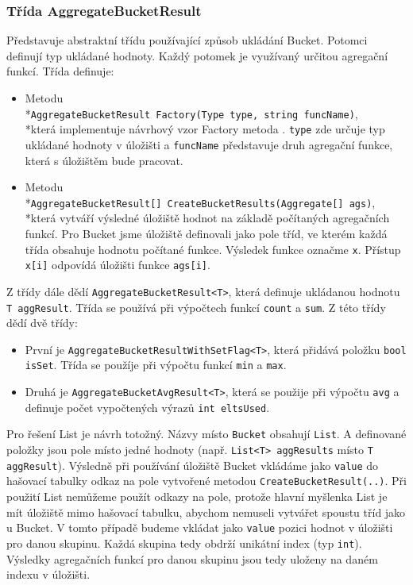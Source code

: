 \subsubsection{Třída AggregateBucketResult}

Představuje abstraktní třídu používající způsob ukládání Bucket.
Potomci definují typ ukládané hodnoty.
Každý potomek je využívaný určitou agregační funkcí.
Třída definuje:
\begin{itemize}
\item Metodu \\*\texttt{AggregateBucketResult Factory(Type type, string funcName)}, \\*která implementuje návrhový vzor Factory metoda \citep[str. 107]{patterns}.
\texttt{type} zde určuje typ ukládané hodnoty v úložišti a \texttt{funcName} představuje druh agregační funkce, která s úložištěm bude pracovat.
\item Metodu \\*\texttt{AggregateBucketResult[] CreateBucketResults(Aggregate[] ags)}, \\*která vytváří výsledné úložiště hodnot na základě počítaných agregačních funkcí.
Pro Bucket jsme úložiště definovali jako pole tříd, ve kterém každá třída obsahuje hodnotu počítané funkce.
Výsledek funkce označme \texttt{x}. 
Přístup \texttt{x[i]} odpovídá úložišti funkce \texttt{ags[i]}.
\end{itemize}
Z třídy dále dědí \texttt{AggregateBucketResult<T>}, která definuje ukládanou hodnotu \texttt{T aggResult}.
Třída se používá při výpočtech funkcí \texttt{count} a \texttt{sum}.
Z této třídy dědí dvě třídy:
\begin{itemize}
\item První je \texttt{AggregateBucketResultWithSetFlag<T>}, která přidává položku \texttt{bool isSet}.
Třída se použíje při výpočtu funkcí \texttt{min} a \texttt{max}.
\item Druhá je \texttt{AggregateBucketAvgResult<T>}, která se použije při výpočtu \texttt{avg} a definuje počet vypočtených výrazů \texttt{int eltsUsed}.
\end{itemize}

Pro řešení List je návrh totožný.
Názvy místo \texttt{Bucket} obsahují \texttt{List}.
A definované položky jsou pole místo jedné hodnoty (např. \texttt{List<T> aggResults} místo \texttt{T aggResult}).
Výsledně při používání úložiště Bucket vkládáme jako \texttt{value} do hašovací tabulky odkaz na pole vytvořené metodou \texttt{CreateBucketResult(..)}.
Při použití List nemůžeme použít odkazy na pole, protože hlavní myšlenka List je mít úložiště mimo hašovací tabulku, abychom nemuseli vytvářet spoustu tříd jako u Bucket.
V tomto případě budeme vkládat jako \texttt{value} pozici hodnot v úložišti pro danou skupinu.
Každá skupina tedy obdrží unikátní index (typ \texttt{int}).
Výsledky agregačních funkcí pro danou skupinu jsou tedy uloženy na daném indexu v úložišti.

